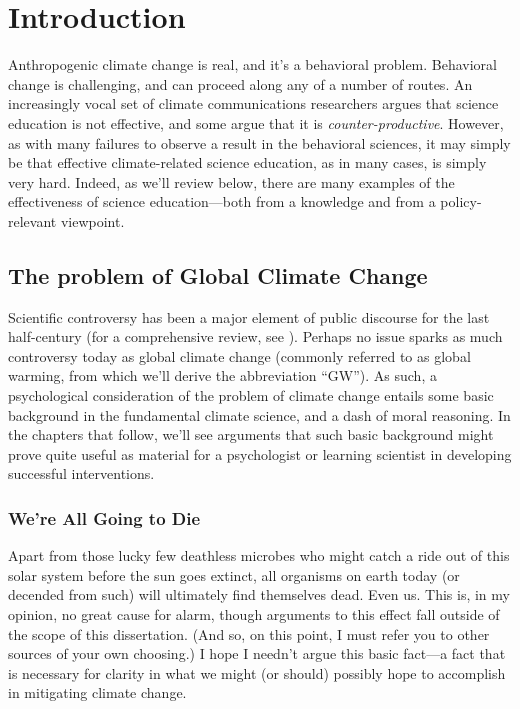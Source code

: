 \graphicspath{{intro/}}

\chapter{Introduction} \label{chap:intro}

Anthropogenic climate change is real, and it's a behavioral problem. Behavioral
change is challenging, and can proceed along any of a number of routes. An
increasingly vocal set of climate communications researchers argues that science
education is not effective, and some argue that it is \emph{counter-productive}.
However, as with many failures to observe a result in the behavioral sciences,
it may simply be that effective climate-related science education, as in many cases,
is simply very hard. Indeed, as we'll review below, there are many examples of the
effectiveness of science education---both from a knowledge and from a
policy-relevant viewpoint. 

\section{The problem of Global Climate Change}

Scientific controversy has been a major element of public discourse for the last
half-century (for a comprehensive review, see \cite{oreskes_merchants_2010}).
Perhaps no issue sparks as much controversy today as global climate change
(commonly referred to as global warming, from which we'll derive the
abbreviation “GW”). As such, a psychological consideration of the problem of
climate change entails some basic background in the fundamental climate science,
and a dash of moral reasoning. In the chapters that follow, we'll see arguments
that such basic background might prove quite useful as material for a
psychologist or learning scientist in developing successful interventions.

\subsection{We're All Going to Die}

Apart from those lucky few deathless microbes who might catch a ride out of this
solar system before the sun goes extinct, all organisms on earth today (or
decended from such) will ultimately find themselves dead. Even us. This is, in
my opinion, no great cause for alarm, though arguments to this effect fall
outside of the scope of this dissertation. (And so, on this point, I must refer
you to other sources of your own choosing.) I hope I needn't argue this basic
fact---a fact that is necessary for clarity in what we might (or should)
possibly hope to accomplish in mitigating climate change.

